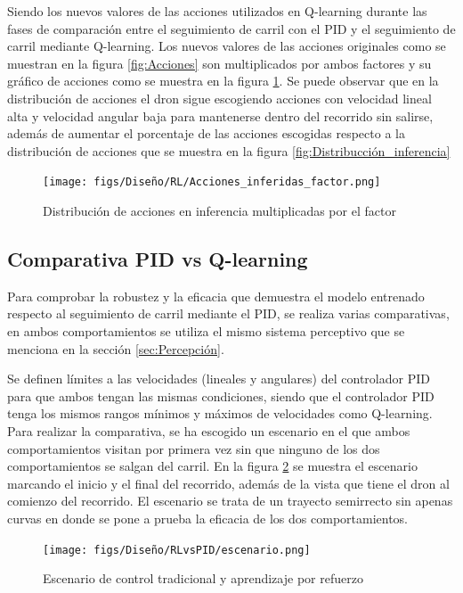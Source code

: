 Siendo los nuevos valores de las acciones utilizados en Q-learning durante las fases de comparación entre el seguimiento de carril con el PID y el seguimiento de carril mediante Q-learning. Los nuevos
valores de las acciones originales como se muestran en la figura \ref{fig:Acciones} son multiplicados por ambos factores
y su gráfico de acciones como se muestra en la figura \ref{fig:inferencia_factor}. Se puede observar que en la distribución de acciones el dron
sigue escogiendo acciones con velocidad lineal alta y velocidad angular baja para mantenerse dentro del recorrido sin salirse, además de aumentar el porcentaje de las acciones escogidas respecto a la distribución de acciones
que se muestra en la figura \ref{fig:Distribucción_inferencia}

\begin{figure} [H]
  \begin{center}
    \texttt{[image: figs/Diseño/RL/Acciones\_inferidas\_factor.png]}
  \end{center}
  \caption{Distribución de acciones en inferencia multiplicadas por el factor}
  \label{fig:inferencia_factor}
\end{figure}

\subsection{Comparativa PID vs Q-learning}
\label{sec:Análisis y comparativa entre el seguiento de carril clásico}
Para comprobar la robustez y la eficacia que demuestra el modelo entrenado respecto al seguimiento de carril mediante el PID, se realiza varias comparativas, en ambos
comportamientos se utiliza el mismo sistema perceptivo que se menciona en la sección \ref{sec:Percepción}. 

Se definen límites a las velocidades (lineales y angulares) del controlador PID para que ambos tengan las mismas condiciones, siendo que el controlador PID tenga los mismos 
rangos mínimos y máximos de velocidades como Q-learning. Para realizar la comparativa, se ha escogido un escenario en el que ambos comportamientos visitan por primera vez 
sin que ninguno de los dos comportamientos se salgan del carril. En la figura \ref{fig:escenario-comparativa} se muestra el escenario marcando el inicio 
y el final del recorrido, además de la vista que tiene el dron al comienzo del recorrido. El escenario se trata de un trayecto semirrecto sin apenas curvas en donde se pone a prueba
la eficacia de los dos comportamientos. 


\begin{figure} [H]
  \begin{center}
    \texttt{[image: figs/Diseño/RLvsPID/escenario.png]}
  \end{center}
  \caption{Escenario de control tradicional y aprendizaje por refuerzo}
  \label{fig:escenario-comparativa}
\end{figure}

